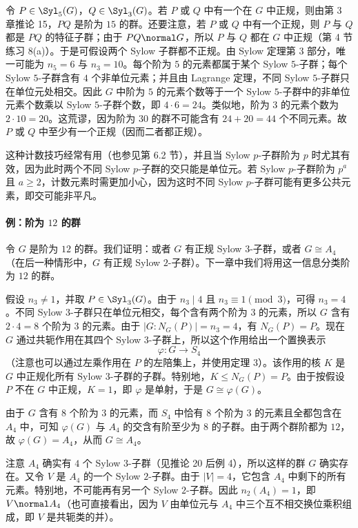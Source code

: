 令 $P\in\Syl_5(G)$，$Q\in\Syl_3(G)$。若 $P$ 或 $Q$ 中有一个在 $G$ 中正规，则由第 3 章推论 15，$PQ$ 是阶为 $15$ 的群。还要注意，若 $P$ 或 $Q$ 中有一个正规，则 $P$ 与 $Q$ 都是 $PQ$ 的特征子群；由于 $PQ\normal G$，所以 $P$ 与 $Q$ 都在 $G$ 中正规（第 4 节练习 8(a)）。于是可假设两个 Sylow 子群都不正规。由 Sylow 定理第 3 部分，唯一可能为 $n_5=6$ 与 $n_3=10$。每个阶为 $5$ 的元素都属于某个 Sylow $5$-子群；每个 Sylow $5$-子群含有 $4$ 个非单位元素；并且由 Lagrange 定理，不同 Sylow $5$-子群只在单位元处相交。因此 $G$ 中阶为 $5$ 的元素个数等于一个 Sylow $5$-子群中的非单位元素个数乘以 Sylow $5$-子群个数，即 $4\cdot6=24$。类似地，阶为 $3$ 的元素个数为 $2\cdot10=20$。这荒谬，因为阶为 $30$ 的群不可能含有 $24+20=44$ 个不同元素。故 $P$ 或 $Q$ 中至少有一个正规（因而二者都正规）。

这种计数技巧经常有用（也参见第 6.2 节），并且当 Sylow $p$-子群阶为 $p$ 时尤其有效，因为此时两个不同 Sylow $p$-子群的交只能是单位元。若 Sylow $p$-子群阶为 $p^a$ 且 $a\geq2$，计数元素时需更加小心，因为这时不同 Sylow $p$-子群可能有更多公共元素，即交可能非平凡。

\paragraph{例：阶为 $12$ 的群}
令 $G$ 是阶为 $12$ 的群。我们证明：或者 $G$ 有正规 Sylow $3$-子群，或者 $G\cong A_4$（在后一种情形中，$G$ 有正规 Sylow $2$-子群）。下一章中我们将用这一信息分类阶为 $12$ 的群。

假设 $n_3\neq1$，并取 $P\in\Syl_3(G)$。由于 $n_3\mid4$ 且 $n_3\equiv1\pmod3$，可得 $n_3=4$。不同 Sylow $3$-子群只在单位元相交，每个含有两个阶为 $3$ 的元素，所以 $G$ 含有 $2\cdot4=8$ 个阶为 $3$ 的元素。由于 $|G:N_G(P)|=n_3=4$，有 $N_G(P)=P$。现在 $G$ 通过共轭作用在其四个 Sylow $3$-子群上，所以这个作用给出一个置换表示
\[
  \varphi:G\to S_4
\]
（注意也可以通过左乘作用在 $P$ 的左陪集上，并使用定理 3）。该作用的核 $K$ 是 $G$ 中正规化所有 Sylow $3$-子群的子群。特别地，$K\leq N_G(P)=P$。由于按假设 $P$ 不在 $G$ 中正规，$K=1$，即 $\varphi$ 是单射，于是 $G\cong\varphi(G)$。

由于 $G$ 含有 $8$ 个阶为 $3$ 的元素，而 $S_4$ 中恰有 $8$ 个阶为 $3$ 的元素且全都包含在 $A_4$ 中，可知 $\varphi(G)$ 与 $A_4$ 的交含有阶至少为 $8$ 的子群。由于两个群阶都为 $12$，故 $\varphi(G)=A_4$，从而 $G\cong A_4$。

注意 $A_4$ 确实有 $4$ 个 Sylow $3$-子群（见推论 20 后例 4），所以这样的群 $G$ 确实存在。又令 $V$ 是 $A_4$ 的一个 Sylow $2$-子群。由于 $|V|=4$，它包含 $A_4$ 中剩下的所有元素。特别地，不可能再有另一个 Sylow $2$-子群。因此 $n_2(A_4)=1$，即 $V\normal A_4$（也可直接看出，因为 $V$ 由单位元与 $A_4$ 中三个互不相交换位乘积组成，即 $V$ 是共轭类的并）。

